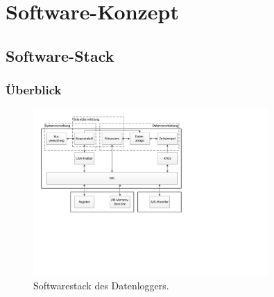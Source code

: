 %
%

\chapter{Software-Konzept}\label{chap.software}


\section{Software-Stack}\label{sec.sw_stack}

\subsection{Überblick}\label{subsec.sw_ueberblick}

\begin{figure}[H]
	\centering
		\includegraphics[width=0.8\textwidth]{images/visio/Softwarestack_Logger.pdf}
	\caption{Softwarestack des Datenloggers.}
	\label{fig.sw_logger}
\end{figure}

